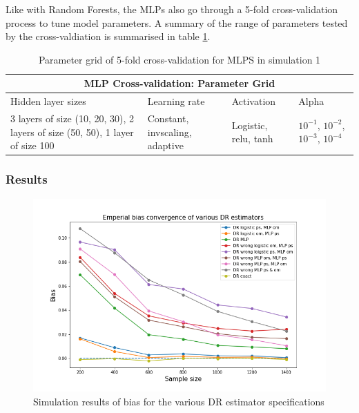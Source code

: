 \documentclass[12pt,twoside]{article}
\begin{document}
Like with Random Forests, the MLPs also go through a 5-fold cross-validation process to tune model parameters. A summary of the range of parameters tested by the cross-valdiation is summarised in table \ref{tableMLP}.

\begin{table}[h!]
    \centering
\begin{tabular}{ |p{3cm}|p{3cm}|p{3cm}|p{3cm}| }
 \hline
 \multicolumn{4}{|c|}{MLP Cross-validation: Parameter Grid} \\
 \hline
 Hidden layer sizes & Learning rate & Activation & Alpha\\
 \hline
 3 layers of size (10, 20, 30), 2 layers of size (50, 50), 1 layer of size 100 & Constant, invscaling, adaptive & Logistic, relu, tanh & $10^{-1}$, $10^{-2}$, $10^{-3}$, $10^{-4}$ \\
 \hline 
\end{tabular}
\caption{Parameter grid of 5-fold cross-validation for MLPS in simulation 1}
\label{tableMLP}
\end{table}

\subsubsection*{Results}

\begin{figure}[h!]
    \centering
    \includegraphics[width = 0.9\columnwidth]{figures/biasMLP.png}
    \caption{Simulation results of bias for the various DR estimator specifications}
    \label{figbiasMLP}
\end{figure}
\end{document}
